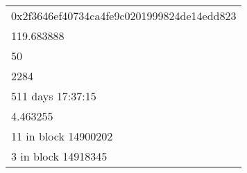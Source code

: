 \begin{tabular}{l}
\toprule
                                           \\
\midrule
0x2f3646ef40734ca4fe9c0201999824de14edd823 \\
                                119.683888 \\
                                        50 \\
                                      2284 \\
                         511 days 17:37:15 \\
                                  4.463255 \\
                      11 in block 14900202 \\
                       3 in block 14918345 \\
\bottomrule
\end{tabular}
